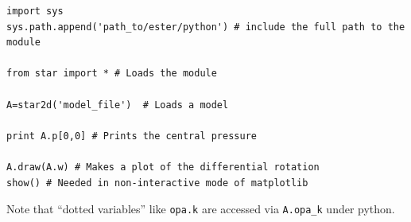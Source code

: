 \begin{verbatim}
import sys
sys.path.append('path_to/ester/python') # include the full path to the module

from star import * # Loads the module

A=star2d('model_file')  # Loads a model 

print A.p[0,0] # Prints the central pressure

A.draw(A.w) # Makes a plot of the differential rotation
show() # Needed in non-interactive mode of matplotlib

\end{verbatim}

Note that ``dotted variables'' like \verb|opa.k| are accessed via \verb|A.opa_k| under
python.



